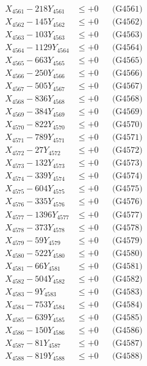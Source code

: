 \documentclass[a4paper,10pt]{article}
\begin{document}
{\begin{align}
\allowbreak
X_{4561} - 218Y_{4561} &\leq +0 && \text{(G4561)} \\
X_{4562} - 145Y_{4562} &\leq +0 && \text{(G4562)} \\
X_{4563} - 103Y_{4563} &\leq +0 && \text{(G4563)} \\
X_{4564} - 1129Y_{4564} &\leq +0 && \text{(G4564)} \\
X_{4565} - 663Y_{4565} &\leq +0 && \text{(G4565)} \\
X_{4566} - 250Y_{4566} &\leq +0 && \text{(G4566)} \\
X_{4567} - 505Y_{4567} &\leq +0 && \text{(G4567)} \\
X_{4568} - 836Y_{4568} &\leq +0 && \text{(G4568)} \\
X_{4569} - 384Y_{4569} &\leq +0 && \text{(G4569)} \\
X_{4570} - 822Y_{4570} &\leq +0 && \text{(G4570)} \\
\allowbreak
X_{4571} - 789Y_{4571} &\leq +0 && \text{(G4571)} \\
X_{4572} - 27Y_{4572} &\leq +0 && \text{(G4572)} \\
X_{4573} - 132Y_{4573} &\leq +0 && \text{(G4573)} \\
X_{4574} - 339Y_{4574} &\leq +0 && \text{(G4574)} \\
X_{4575} - 604Y_{4575} &\leq +0 && \text{(G4575)} \\
X_{4576} - 335Y_{4576} &\leq +0 && \text{(G4576)} \\
X_{4577} - 1396Y_{4577} &\leq +0 && \text{(G4577)} \\
X_{4578} - 373Y_{4578} &\leq +0 && \text{(G4578)} \\
X_{4579} - 59Y_{4579} &\leq +0 && \text{(G4579)} \\
X_{4580} - 522Y_{4580} &\leq +0 && \text{(G4580)} \\
\allowbreak
X_{4581} - 66Y_{4581} &\leq +0 && \text{(G4581)} \\
X_{4582} - 504Y_{4582} &\leq +0 && \text{(G4582)} \\
X_{4583} - 9Y_{4583} &\leq +0 && \text{(G4583)} \\
X_{4584} - 753Y_{4584} &\leq +0 && \text{(G4584)} \\
X_{4585} - 639Y_{4585} &\leq +0 && \text{(G4585)} \\
X_{4586} - 150Y_{4586} &\leq +0 && \text{(G4586)} \\
X_{4587} - 81Y_{4587} &\leq +0 && \text{(G4587)} \\
X_{4588} - 819Y_{4588} &\leq +0 && \text{(G4588)} \\

\end{align}}
\end{document}
